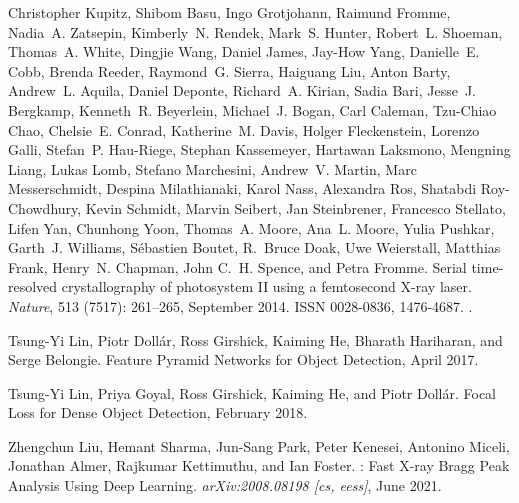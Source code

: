 \documentclass[a4paper]{article}
\begin{document}
\begin{thebibliography}{33}
Christopher Kupitz, Shibom Basu, Ingo Grotjohann, Raimund Fromme, Nadia~A.
  Zatsepin, Kimberly~N. Rendek, Mark~S. Hunter, Robert~L. Shoeman, Thomas~A.
  White, Dingjie Wang, Daniel James, Jay-How Yang, Danielle~E. Cobb, Brenda
  Reeder, Raymond~G. Sierra, Haiguang Liu, Anton Barty, Andrew~L. Aquila,
  Daniel Deponte, Richard~A. Kirian, Sadia Bari, Jesse~J. Bergkamp, Kenneth~R.
  Beyerlein, Michael~J. Bogan, Carl Caleman, Tzu-Chiao Chao, Chelsie~E. Conrad,
  Katherine~M. Davis, Holger Fleckenstein, Lorenzo Galli, Stefan~P.
  {Hau-Riege}, Stephan Kassemeyer, Hartawan Laksmono, Mengning Liang, Lukas
  Lomb, Stefano Marchesini, Andrew~V. Martin, Marc Messerschmidt, Despina
  Milathianaki, Karol Nass, Alexandra Ros, Shatabdi {Roy-Chowdhury}, Kevin
  Schmidt, Marvin Seibert, Jan Steinbrener, Francesco Stellato, Lifen Yan,
  Chunhong Yoon, Thomas~A. Moore, Ana~L. Moore, Yulia Pushkar, Garth~J.
  Williams, S{\'e}bastien Boutet, R.~Bruce Doak, Uwe Weierstall, Matthias
  Frank, Henry~N. Chapman, John C.~H. Spence, and Petra Fromme.
\newblock Serial time-resolved crystallography of photosystem {{II}} using a
  femtosecond {{X-ray}} laser.
\newblock \emph{Nature}, 513 (7517): 261--265, September
  2014.
\newblock ISSN 0028-0836, 1476-4687.
\newblock {}.

Tsung-Yi Lin, Piotr Doll{\'a}r, Ross Girshick, Kaiming He, Bharath Hariharan,
  and Serge Belongie.
\newblock Feature {{Pyramid Networks}} for {{Object Detection}}, April 2017.

Tsung-Yi Lin, Priya Goyal, Ross Girshick, Kaiming He, and Piotr Doll{\'a}r.
\newblock Focal {{Loss}} for {{Dense Object Detection}}, February 2018.

Zhengchun Liu, Hemant Sharma, Jun-Sang Park, Peter Kenesei, Antonino Miceli,
  Jonathan Almer, Rajkumar Kettimuthu, and Ian Foster.
: {{Fast X-ray Bragg Peak Analysis Using Deep Learning}}.
\newblock \emph{arXiv:2008.08198 [cs, eess]}, June 2021.


\end{thebibliography}
\end{document}
